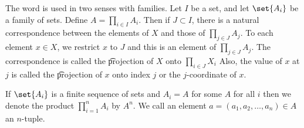 
The word  is used in two senses with families.
Let $I$ be a set, and let $\set{A_i}$ be a family of sets.
Define $A = \prod_{i \in I} A_i$.
Then if $J \subset I$, there is a natural correspondence between the elements of $X$ and those of $\prod_{j \in J} A_j$.
To each element $x \in X$, we restrict $x$ to $J$ and this is an element of $\prod_{j \in J} A_j$.
The correspondence is called the \t{projection} of $X$ onto $\prod_{i \in J} X_i$
Also, the value of $x$ at $j$ is called the \t{projection of $x$ onto index $j$} or the \t{$j$-coordinate} of $x$.


If $\set{A_i}$ is a finite sequence of sets and $A_i = A$ for some $A$ for all $i$ then we denote the product $\prod_{i = 1}^{n} A_i$ by $A^n$.
We call an element $a = (a_1, a_2, \dots, a_n) \in A$ an \t{$n$-tuple}.

